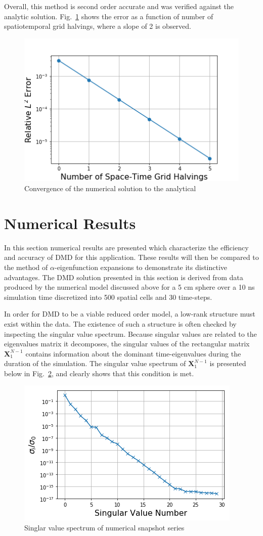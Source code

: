 \documentclass[12pt]{article}
\newcommand{\LFI}[1]{\label{fi:#1}}
\newcommand{\FI}[1]{Fig.~\ref{fi:#1}}
\newcommand{\bfg}{\begin{figure}}
\newcommand{\efg}{\end{figure}}
\begin{document}
Overall, this method is second order accurate and was verified against the analytic solution. 
\FI{2ord} shows the error as a function of number of spatiotemporal grid 
 halvings, where a slope of 2 is observed.

\bfg[h] \centering
	\includegraphics[scale=0.5]{method_convergence.png}
	\caption{Convergence of the numerical solution to the analytical}
	\LFI{2ord}
\efg

\section{Numerical Results}
In this section numerical results are presented which characterize the 
 efficiency and accuracy of DMD for this application.
These results will then be compared to the method of $\alpha$-eigenfunction 
 expansions to demonstrate its distinctive advantages.
The DMD solution presented in this section is derived from data produced by the 
 numerical model discussed above for a 5 cm sphere over a 10 ns simulation time 
 discretized into 500 spatial cells and 30 time-steps. 

In order for DMD to be a viable reduced order model, a low-rank structure must 
 exist within the data.
The existence of such a structure is often checked by inspecting the singular value spectrum.
Because singular values are related to the eigenvalues matrix it decomposes, 
 the singular values of the rectangular matrix $\bm{X}^{N-1}_1$ contains 
 information about the dominant time-eigenvalues during the duration of the simulation.
The singular value spectrum of  $\bm{X}^{N-1}_1$ is presented below in 
 \FI{sv-spec}, and clearly shows that this condition is met.

\bfg[h] \centering
	\includegraphics[scale=0.5]{singularValueSpectrum.png}
	\caption{Singlar value spectrum of numerical snapshot series}
	\LFI{sv-spec}
\efg
\end{document}
